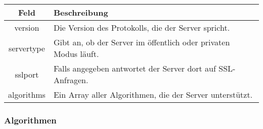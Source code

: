 \documentclass[ngerman,titlepage,parskip=true]{scrartcl}
\begin{document}
    \begin{tabular}{|c|p{14cm}|}
    	\hline
    	\textbf{Feld} & \textbf{Beschreibung} \\ 
    	\hline \hline
    	
    	version & Die Version des Protokolls, die der Server spricht. \\ 
    	\hline
    	
    	servertype & Gibt an, ob der Server im öffentlich oder privaten Modus läuft. \\
    	\hline
    	sslport & Falls angegeben antwortet der Server dort auf SSL-Anfragen.\\
    	\hline
    	
    	algorithms & Ein Array aller Algorithmen, die der Server unterstützt. \\
    	\hline
    \end{tabular}
    
    \subsubsection*{Algorithmen}
    
\end{document}
